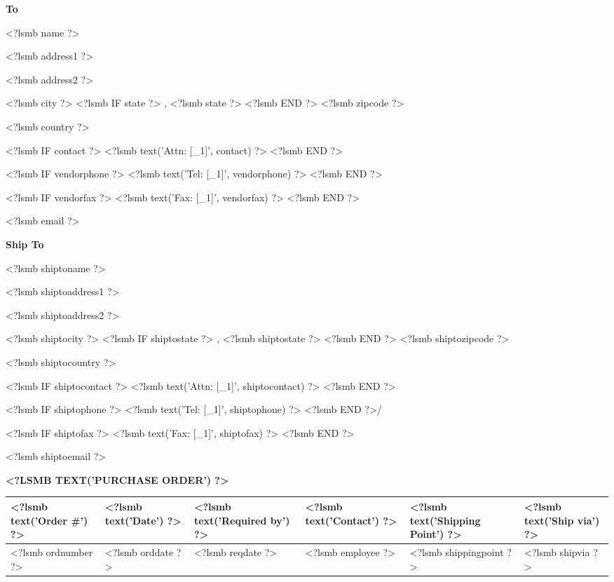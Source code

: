 \parbox[t]{.5\textwidth}{
\textbf{To}
\vspace{0.3cm}

<?lsmb name ?>

<?lsmb address1 ?>

<?lsmb address2 ?>

<?lsmb city ?>
<?lsmb IF state ?>
\hspace{-0.1cm}, <?lsmb state ?>
<?lsmb END ?>
<?lsmb zipcode ?>

<?lsmb country ?>

\vspace{0.3cm}

<?lsmb IF contact ?>
<?lsmb text('Attn: [_1]', contact) ?>
\vspace{0.2cm}
<?lsmb END ?>

<?lsmb IF vendorphone ?>
<?lsmb text('Tel: [_1]', vendorphone) ?>
<?lsmb END ?>

<?lsmb IF vendorfax ?>
<?lsmb text('Fax: [_1]', vendorfax) ?>
<?lsmb END ?>

<?lsmb email ?>
}
\parbox[t]{.5\textwidth}{
\textbf{Ship To}
\vspace{0.3cm}

<?lsmb shiptoname ?>

<?lsmb shiptoaddress1 ?>

<?lsmb shiptoaddress2 ?>

<?lsmb shiptocity ?>
<?lsmb IF shiptostate ?>
\hspace{-0.1cm}, <?lsmb shiptostate ?>
<?lsmb END ?>
<?lsmb shiptozipcode ?>

<?lsmb shiptocountry ?>

\vspace{0.3cm}

<?lsmb IF shiptocontact ?>
<?lsmb text('Attn: [_1]', shiptocontact) ?>
\vspace{0.2cm}
<?lsmb END ?>

<?lsmb IF shiptophone ?>
<?lsmb text('Tel: [_1]', shiptophone) ?>
<?lsmb END ?>/

<?lsmb IF shiptofax ?>
<?lsmb text('Fax: [_1]', shiptofax) ?>
<?lsmb END ?>

<?lsmb shiptoemail ?>
}
\hfill

\vspace{1cm}

\textbf{\MakeUppercase{<?lsmb text('Purchase Order') ?>}}
\hfill

\vspace{1cm}
\begin{tabularx}{\textwidth}{*{6}{|X}|} \hline
  \textbf{<?lsmb text('Order #') ?>} & \textbf{<?lsmb text('Date') ?>}
   & \textbf{<?lsmb text('Required by') ?>} & \textbf{<?lsmb text('Contact') ?>}
   & \textbf{<?lsmb text('Shipping Point') ?>}
   & \textbf{<?lsmb text('Ship via') ?>} \\ [0.5ex]
  \hline
  <?lsmb ordnumber ?> & <?lsmb orddate ?> & <?lsmb reqdate ?> & <?lsmb employee ?> & <?lsmb shippingpoint ?> & <?lsmb shipvia ?> \\
  \hline
\end{tabularx}

